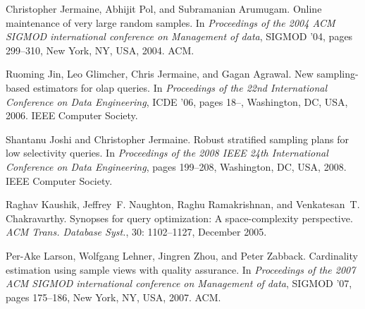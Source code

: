 \begin{thebibliography}{67}
Christopher Jermaine, Abhijit Pol, and Subramanian Arumugam.
\newblock Online maintenance of very large random samples.
\newblock In \emph{Proceedings of the 2004 ACM SIGMOD international conference
  on Management of data}, SIGMOD '04, pages 299--310, New York, NY, USA, 2004.
  ACM.

Ruoming Jin, Leo Glimcher, Chris Jermaine, and Gagan Agrawal.
\newblock New sampling-based estimators for olap queries.
\newblock In \emph{Proceedings of the 22nd International Conference on Data
  Engineering}, ICDE '06, pages 18--, Washington, DC, USA, 2006. IEEE Computer
  Society.

Shantanu Joshi and Christopher Jermaine.
\newblock Robust stratified sampling plans for low selectivity queries.
\newblock In \emph{Proceedings of the 2008 IEEE 24th International Conference
  on Data Engineering}, pages 199--208, Washington, DC, USA, 2008. IEEE
  Computer Society.

Raghav Kaushik, Jeffrey~F. Naughton, Raghu Ramakrishnan, and Venkatesan~T.
  Chakravarthy.
\newblock Synopses for query optimization: A space-complexity perspective.
\newblock \emph{ACM Trans. Database Syst.}, 30: 1102--1127, December
  2005.

Per-Ake Larson, Wolfgang Lehner, Jingren Zhou, and Peter Zabback.
\newblock Cardinality estimation using sample views with quality assurance.
\newblock In \emph{Proceedings of the 2007 ACM SIGMOD international conference
  on Management of data}, SIGMOD '07, pages 175--186, New York, NY, USA, 2007.
  ACM.


\end{thebibliography}
